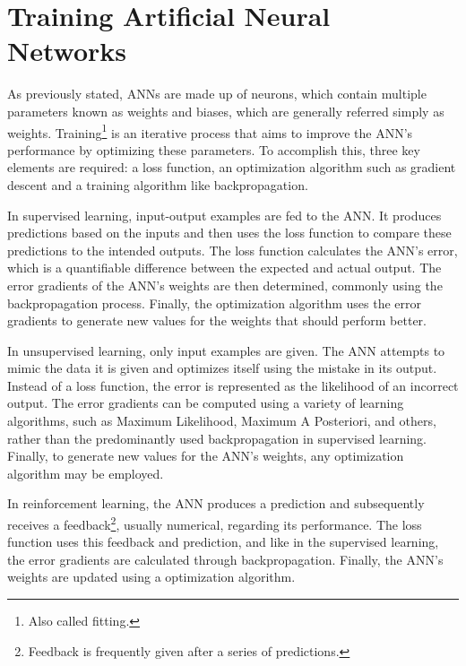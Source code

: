 
\section{Training Artificial Neural Networks}
As previously stated, ANNs are made up of neurons, which contain multiple parameters known as weights and biases, which are generally referred simply as weights. Training\footnote{Also called fitting.} is an iterative process that aims to improve the ANN's performance by optimizing these parameters. To accomplish this, three key elements are required: a loss function, an optimization algorithm such as gradient descent and a training algorithm like backpropagation.

In supervised learning, input-output examples are fed to the ANN. It produces predictions based on the inputs and then uses the loss function to compare these predictions to the intended outputs. The loss function calculates the ANN's error, which is a quantifiable difference between the expected and actual output. The error gradients of the ANN's weights are then determined, commonly using the backpropagation process. Finally, the optimization algorithm uses the error gradients to generate new values for the weights that should perform better.

In unsupervised learning, only input examples are given. The ANN attempts to mimic the data it is given and optimizes itself using the mistake in its output. Instead of a loss function, the error is represented as the likelihood of an incorrect output. The error gradients can be computed using a variety of learning algorithms, such as Maximum Likelihood, Maximum A Posteriori, and others, rather than the predominantly used backpropagation in supervised learning. Finally, to generate new values for the ANN's weights, any optimization algorithm may be employed.

In reinforcement learning, the ANN produces a prediction and subsequently receives a feedback\footnote{Feedback is frequently given after a series of predictions.}, usually numerical, regarding its performance. The loss function uses this feedback and prediction, and like in the supervised learning, the error gradients are calculated through backpropagation. Finally, the ANN's weights are updated using a optimization algorithm.

